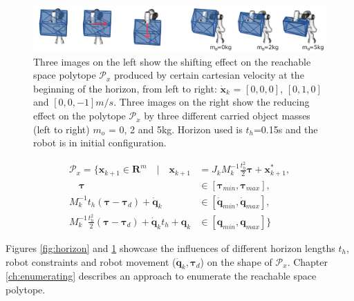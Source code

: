 \begin{figure}[!t]
    \centering
    \includegraphics[width=\linewidth]{Papers/images/vel_object.png}
    \caption{Three images on the left show the shifting effect on the reachable space polytope $\mathcal{P}_x$ produced by certain cartesian velocity at the beginning of the horizon, from left to right: $\dot{\bm{x}}_k$ = $[0,0,0]$, $[0,1,0] $ and $[0,0,-1]m/s$. Three images on the right show the reducing effect on the polytope $\mathcal{P}_x$ by three different carried object masses (left to right) $m_o$ = 0, 2 and 5kg. Horizon used is $t_h$=0.15s and the robot is in initial configuration.}
    \label{fig:velocity}
    
\end{figure}


\begin{equation}
\begin{split}
    \mathcal{P}_x = \{ \bm{x}_{k+1} \in \mathbf{R}^m \quad| \quad \bm{x}_{k+1} &= J_k M_k^{-1}\frac{t_h^2}{2}\bm{\tau} + \bm{x}^*_{k+1},\\
    \quad \bm{\tau} &\in \left[\bm{\tau}_{min},\bm{\tau}_{max}\right],\\
   M_k^{-1}t_h (\bm{\tau} - \bm{\tau}_d) + \dot{\bm{q}}_{k} &\in \left[\dot{\bm{q}}_{min},\dot{\bm{q}}_{max}\right],\\
   M_k^{-1}\frac{t_h^2}{2}(\bm{\tau} - \bm{\tau}_d) +  \dot{\bm{q}}_{k}t_h + \bm{q}_{k} &\in \left[\bm{q}_{min},\bm{q}_{max}\right] \}
\end{split} 
\label{eq:polytope_simple}
\end{equation}

Figures \ref{fig:horizon} and \ref{fig:velocity} showcase the influences of different horizon lengths $t_h$, robot constraints and robot movement ($\dot{\bm{q}}_k,\bm{\tau}_d$) on the shape of $\mathcal{P}_x$. Chapter \ref{ch:enumerating} describes an approach to enumerate the reachable space polytope. 





